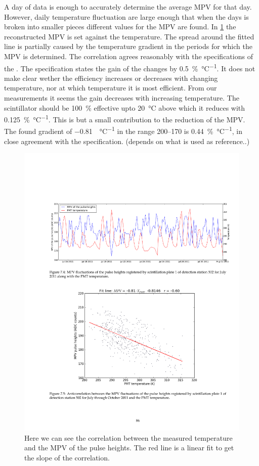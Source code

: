 A day of data is enough to accurately determine the average MPV for that day. However, daily temperature fluctuation are large enough that when the days is broken into smaller pieces different values for the MPV are found. In \cref{fig:mpv_temperature} the reconstructed MPV is set against the \pmt temperature. The spread around the fitted line is partially caused by the temperature gradient in the periods for which the MPV is determined. The correlation agrees reasonably with the specifications of the \pmt. The specification states the gain of the \pmt changes by \SI{0.5}{\percent\per\degreeCelsius}. It does not make clear wether the efficiency increases or decreases with changing temperature, nor at which temperature it is most efficient. From our measurements it seems the gain decreases with increasing temperature. The scintillator should be \SI{100}{\percent} effective upto \SI{20}{\degreeCelsius} above which it reduces with \SI{0.125}{\percent\per\degreeCelsius}. This is but a small contribution to the reduction of the MPV. The found gradient of \SI{-0.81}{\adc\per\degreeCelsius} in the range \SIrange{200}{170}{\adc} is \SI{0.44}{\percent\per\degreeCelsius}, in close agreement with the specification. (depends on what is used as reference..)

\begin{figure}
    \centering
    \includegraphics[width=.7\linewidth]{plots/detector/mpv_temperature}
    \caption{Here we can see the correlation between the measured temperature and the MPV of the pulse heights. The red line is a linear fit to get the slope of the correlation.}
    \label{fig:mpv_temperature}
\end{figure}


